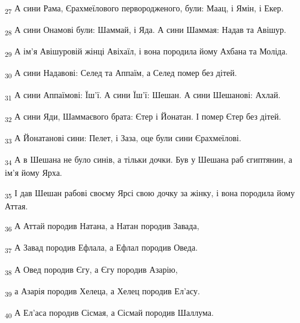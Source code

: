 \begin{tcolorbox}
\textsubscript{27} А сини Рама, Єрахмеїлового первородженого, були: Маац, і Ямін, і Екер.
\end{tcolorbox}
\begin{tcolorbox}
\textsubscript{28} А сини Онамові були: Шаммай, і Яда. А сини Шаммая: Надав та Авішур.
\end{tcolorbox}
\begin{tcolorbox}
\textsubscript{29} А ім'я Авішуровій жінці Авіхаїл, і вона породила йому Ахбана та Моліда.
\end{tcolorbox}
\begin{tcolorbox}
\textsubscript{30} А сини Надавові: Селед та Аппаїм, а Селед помер без дітей.
\end{tcolorbox}
\begin{tcolorbox}
\textsubscript{31} А сини Аппаїмові: Їш'ї. А сини Їш'ї: Шешан. А сини Шешанові: Ахлай.
\end{tcolorbox}
\begin{tcolorbox}
\textsubscript{32} А сини Яди, Шаммаєвого брата: Єтер і Йонатан. І помер Єтер без дітей.
\end{tcolorbox}
\begin{tcolorbox}
\textsubscript{33} А Йонатанові сини: Пелет, і Заза, оце були сини Єрахмеїлові.
\end{tcolorbox}
\begin{tcolorbox}
\textsubscript{34} А в Шешана не було синів, а тільки дочки. Був у Шешана раб єгиптянин, а ім'я йому Ярха.
\end{tcolorbox}
\begin{tcolorbox}
\textsubscript{35} І дав Шешан рабові своєму Ярсі свою дочку за жінку, і вона породила йому Аттая.
\end{tcolorbox}
\begin{tcolorbox}
\textsubscript{36} А Аттай породив Натана, а Натан породив Завада,
\end{tcolorbox}
\begin{tcolorbox}
\textsubscript{37} А Завад породив Ефлала, а Ефлал породив Оведа.
\end{tcolorbox}
\begin{tcolorbox}
\textsubscript{38} А Овед породив Єгу, а Єгу породив Азарію,
\end{tcolorbox}
\begin{tcolorbox}
\textsubscript{39} а Азарія породив Хелеца, а Хелец породив Ел'асу.
\end{tcolorbox}
\begin{tcolorbox}
\textsubscript{40} А Ел'аса породив Сісмая, а Сісмай породив Шаллума.
\end{tcolorbox}
